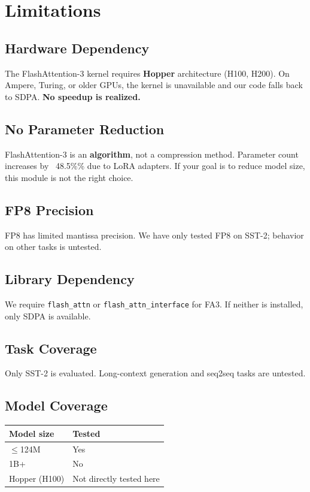 \section{Limitations}

\subsection{Hardware Dependency}

The FlashAttention-3 kernel requires \textbf{Hopper} architecture (H100, H200). 
On Ampere, Turing, or older GPUs, the kernel is unavailable and our code 
falls back to SDPA. \textbf{No speedup is realized.}

\subsection{No Parameter Reduction}

FlashAttention-3 is an \textbf{algorithm}, not a compression method. Parameter 
count increases by ~48.5\%\% due to LoRA adapters. If your goal is 
to reduce model size, this module is not the right choice.

\subsection{FP8 Precision}

FP8 has limited mantissa precision. We have only tested FP8 on SST-2; 
behavior on other tasks is untested.

\subsection{Library Dependency}

We require \texttt{flash\_attn} or \texttt{flash\_attn\_interface} for FA3. If neither is 
installed, only SDPA is available.

\subsection{Task Coverage}

Only SST-2 is evaluated. Long-context generation and seq2seq tasks are 
untested.

\subsection{Model Coverage}

\begin{table}[H]
\centering
\small
\begin{tabular}{ll}
\toprule
\textbf{Model size} & \textbf{Tested} \\
\midrule
$\le$124M & Yes \\
1B+ & No \\
Hopper (H100) & Not directly tested here \\
\bottomrule
\end{tabular}
\end{table}


